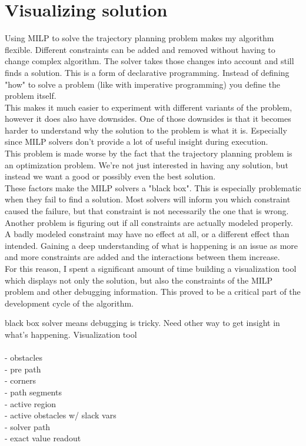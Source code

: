 \section{Visualizing solution}
\label{section:visual}
Using MILP to solve the trajectory planning problem makes my algorithm flexible. Different constraints can be added and removed without having to change complex algorithm. The solver takes those changes into account and still finds a solution. This is a form of declarative programming. Instead of defining "how" to solve a problem (like with imperative programming) you define the problem itself.\\
This makes it much easier to experiment with different variants of the problem, however it does also have downsides. One of those downsides is that it becomes harder to understand why the solution to the problem is what it is. Especially since MILP solvers don't provide a lot of useful insight during execution.\\
This problem is made worse by the fact that the trajectory planning problem is an optimization problem. We're not just interested in having any solution, but instead we want a good or possibly even the best solution.\\
These factors make the MILP solvers a "black box". This is especially problematic when they fail to find a solution. Most solvers will inform you which constraint caused the failure, but that constraint is not necessarily the one that is wrong. Another problem is figuring out if all constraints are actually modeled properly. A badly modeled constraint may have no effect at all, or a different effect than intended. Gaining a deep understanding of what is happening is an issue as more and more constraints are added and the interactions between them increase.\\
For this reason, I spent a significant amount of time building a visualization tool which displays not only the solution, but also the constraints of the MILP problem and other debugging information. This proved to be a critical part of the development cycle of the algorithm.



black box solver means debugging is tricky. Need other way to get insight in what's happening. Visualization tool \\ \\

- obstacles \\
- pre path \\
- corners \\
- path segments\\
- active region\\
- active obstacles w/ slack vars\\
- solver path\\
- exact value readout \\